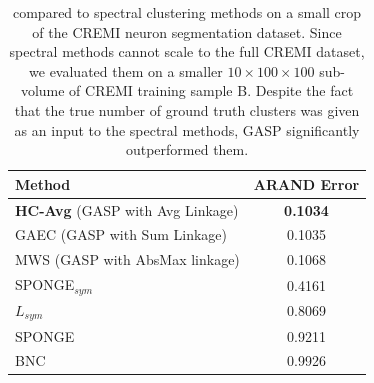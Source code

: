 \begin{table}[t]
\centering
\footnotesize
{} %
\begin{tabular}[t]{l | c}
\footnotesize
           Method & ARAND Error \\ \midrule
           \textbf{HC-Avg} (GASP with Avg Linkage) & \textbf{0.1034} \\
GAEC \cite{keuper2015efficient} (GASP with Sum Linkage) & 0.1035 \\
MWS \cite{wolf2018mutex} (GASP with AbsMax linkage) & 0.1068 \\
SPONGE$_{sym}$ \cite{Cucuringu2019SPONGEAG} & 0.4161\\
$L_{sym}$ \cite{kunegis2010spectral} & 0.8069 \\
SPONGE \cite{Cucuringu2019SPONGEAG} & 0.9211 \\
BNC \cite{chiang2012scalable} & 0.9926 \\
        \end{tabular}
    \caption{\algname{} compared to spectral clustering methods on a small crop of the CREMI neuron segmentation dataset. 
    Since spectral methods cannot scale to the full CREMI dataset, we evaluated them on a smaller $10\times100\times100$ sub-volume of CREMI training sample B.
    Despite the fact that the true number of ground truth clusters was given as an input to the spectral methods, GASP significantly outperformed them. 
    }
    \label{tab:cremi_spectral_experiments}
\end{table}


